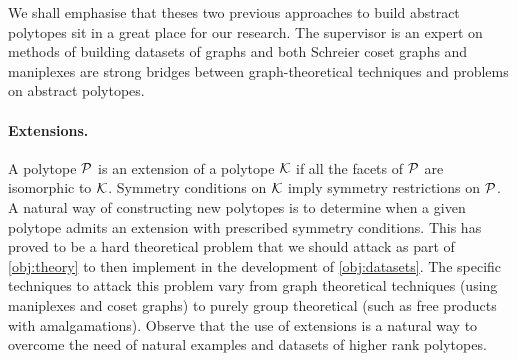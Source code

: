 We shall emphasise that theses two previous approaches to build abstract polytopes sit in a great place for our research.
The supervisor is an expert on methods of building datasets of graphs and both Schreier coset graphs and maniplexes are strong bridges between graph-theoretical techniques and problems on abstract polytopes.


\paragraph{Extensions.} A polytope $\mathcal{P}$ is an extension of a polytope $\mathcal{K}$ if all the facets of $\mathcal{P}$ are isomorphic to $\mathcal{K}$. Symmetry conditions on $\mathcal{K}$ imply symmetry restrictions on $\mathcal{P}$.
A natural way of constructing new polytopes is to determine when a given polytope admits an extension with prescribed symmetry conditions.
This has proved to be a hard theoretical problem that we should attack as part of \cref{obj:theory} to then implement in the development of \cref{obj:datasets}.
The specific techniques to attack this problem vary from graph theoretical techniques (using maniplexes and coset graphs) to purely group theoretical (such as free products with amalgamations).
Observe that the use of extensions is a natural way to overcome the need of natural examples and datasets of higher rank polytopes.


